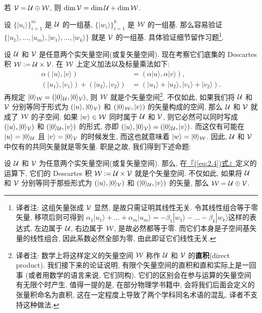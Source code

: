 \documentclass[lang=cn,zihao=-4,twoside,fontset=none]{textbook}
\makeatletter
\def\EQ#1{\begin{equation}\begin{aligned}{}#1\end{aligned}\end{equation}}
\renewcommand{\eqref}[1]{\hyperref[#1]{『\textnormal{(\ref*{#1})}式』}}
\newcommand{\set}[1]{\{#1\}}
\renewcommand{\ket}[1]{| #1 \rangle}
\newcommand{\addterm}[2]{\textbf{#1}{(#2)}\index[nidx]{#1@\textbf{#1}(#2)}}
\makeatother
\begin{document}
\begin{prop}[直和空间的维数]
    \label{prop:2.1.18}%
    若 ${\mathcal V} = {\mathcal U}\oplus{\mathcal W}$, 则 $\dim{\mathcal V}= \dim{\mathcal U} + \dim{\mathcal W}$.
\end{prop}
\begin{prop}
    设 $\set{\ket{u_i}}_{i=1}^m$ 是 ${\mathcal U}$ 的一组基, $\set{\ket{w_i}}_{i=1}^k$ 是 ${\mathcal W}$ 的一组基. 那么容易验证 $\set{\ket{u_1},\dots,\ket{u_m},\ket{w_1},\dots,\ket{w_k}}$ 就是 ${\mathcal V}$ 的一组基. 具体验证细节留作习题\footnote{译者注: 这组矢量张成 ${\mathcal V}$ 显然, 是故只需证明其线性无关. 令其线性组合等于零矢量, 移项后则可得到 $\alpha_1\ket{u_1}+\dots+\alpha_m\ket{u_m}=-\beta_1\ket{w_1}-\dots-\beta_k\ket{w_k}$这样的表达式, 左边属于 ${\mathcal U}$, 右边属于 ${\mathcal W}$, 是故必然都等于零. 而它们本身是子空间基矢量的线性组合, 因此系数必然全部为零, 由此即证它们线性无关.}.
\end{prop}

设 ${\mathcal U}$ 和 ${\mathcal V}$ 是任意两个实矢量空间(或复矢量空间). 现在考察它们底集的 Descartes 积 ${\mathcal W}:={\mathcal U}\times{\mathcal V}$. 在 ${\mathcal W}$ 上定义加法以及标量乘法如下:
\EQ{
    \alpha(\ket{u},\ket{v})&=(\alpha\ket{u},\alpha\ket{v}),\\
    (\ket{u_1},\ket{v_1})+(\ket{u_2},\ket{v_2})&=(\ket{u_1}+\ket{u_2},\ket{v_1}+\ket{v_2}). \label{eq:2.4}
}
再规定 $\ket{0}_{\mW}=(\ket{0}_{\mU},\ket{0}_{\mV})$, 则 ${\mathcal W}$ 就是个矢量空间\footnote{译者注: 数学上将这样定义的矢量空间 ${\mathcal W}$ 称作 ${\mathcal U}$ 和 ${\mathcal V}$ 的\addterm{直积}{direct product}. 我们接下来的论证说明, 有限个矢量空间的直积和直和实际上是一回事 (或者用数学的语言来说, 它们同构). 它们的区别会在参与运算的矢量空间有无限个时产生. 值得一提的是, 在部分物理学书籍中, 会将我们后面会定义的张量积命名为直积, 这在一定程度上导致了两个学科同名术语的混乱, 译者不支持这种做法.}. 不仅如此, 如果我们将 ${\mathcal U}$ 和 ${\mathcal V}$ 分别等同于形式为 $(\ket{u},\ket{0}_{\mV})$ 和 $(\ket{0}_{\mW},\ket{v})$ 的矢量构成的空间, 那么 ${\mathcal U}$ 和 ${\mathcal V}$ 就成了 ${\mathcal W}$ 的子空间. 如果 $\ket{w}\in\mW$ 同时属于 ${\mathcal U}$ 和 ${\mathcal V}$, 则它必然可以同时写成 $(\ket{u},\ket{0}_{\mV})$ 和 $(\ket{0}_{\mU},\ket{v})$ 的形式, 亦即 $(\ket{u},\ket{0}_{\mV})=(\ket{0}_{\mU},\ket{v})$. 而这仅有可能在 $\ket{u}=\ket{0}_{\mU}$ 且 $\ket{v}=\ket{0}_{\mV}$ 的时候发生, 而这也就意味着 $\ket{w}=\ket{0}_{\mW}$. 因此, ${\mathcal U}$ 和 ${\mathcal V}$ 中仅有的共同矢量就是零矢量. 职是之故, 我们得到下述命题:

\begin{prop}
    \label{prop:2.1.19}%
    设 ${\mathcal U}$ 和 ${\mathcal V}$ 为任意两个实矢量空间(或复矢量空间). 那么, 在\eqref{eq:2.4}定义的运算下, 它们的 Descartes 积 ${\mathcal W}:={\mathcal U}\times{\mathcal V}$ 就是个矢量空间. 不仅如此, 如果将 ${\mathcal U}$ 和 ${\mathcal V}$ 分别等同于那些形式为 $(\ket{u},\ket{0}_{\mV})$ 和 $(\ket{0}_{\mU},\ket{v})$ 的矢量, 那么 ${\mathcal W}={\mathcal U}\oplus{\mathcal V}$.
\end{prop}
\end{document}
